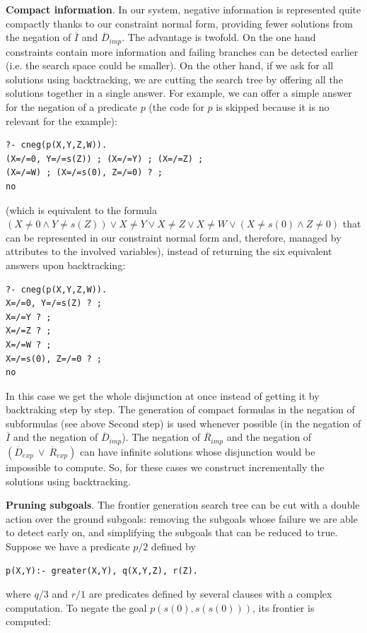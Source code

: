 \documentclass{tlp}
\begin{document}
\noindent
{\bf Compact information}. In our system, negative information is
represented quite compactly thanks to our constraint normal form,
providing fewer solutions from the negation of $\overline{I}$ and
$\overline{D}_{imp}$. The advantage is twofold. On the one hand
constraints contain more information and failing branches can be
detected earlier (i.e. the search space could be smaller). On the
other hand, if we ask for all solutions using backtracking, we are
cutting the search tree by offering all the solutions together in a
single answer. For example, we can offer a simple answer for the
negation of a predicate $p$ (the code for $p$ is skipped because it is
no relevant for the example): {
\begin{verbatim}
?- cneg(p(X,Y,Z,W)).
(X=/=0, Y=/=s(Z)) ; (X=/=Y) ; (X=/=Z) ; 
(X=/=W) ; (X=/=s(0), Z=/=0) ? ;
no
\end{verbatim}
}
\noindent
(which is equivalent to the formula $ (X \neq 0 \wedge Y\neq s(Z))
\vee X \neq Y \vee X \neq Z \vee X \neq W \vee (X \neq s(0) \wedge Z
\neq 0)$ that can be represented in our constraint normal form and,
therefore, managed by attributes to the involved variables), instead
of returning the six equivalent answers upon backtracking: {
\begin{verbatim}
?- cneg(p(X,Y,Z,W)).
X=/=0, Y=/=s(Z) ? ;
X=/=Y ? ;
X=/=Z ? ;
X=/=W ? ;
X=/=s(0), Z=/=0 ? ;
no
\end{verbatim}
} 
\noindent
In this case we get the whole disjunction at once instead of getting
it by backtraking step by step. The generation of compact formulas in
the negation of subformulas (see above Second step) is used whenever
possible (in the negation of $\overline{I}$ and the negation of
$\overline{D}_{imp}$). The negation of $\overline{R}_{imp}$ and the
negation of $(\overline{D}_{exp} ~ \vee ~ \overline{R}_{exp})$ can
have infinite solutions whose disjunction would be impossible to
compute. So, for these cases we construct incrementally the solutions
using backtracking.
\bigskip

\noindent
{\bf Pruning subgoals}. The frontier generation search tree can be
cut with a double action over the ground subgoals: removing the
subgoals whose failure we are able to detect early on, and simplifying the
subgoals that can be reduced to true. Suppose  we have a predicate $p/2$
defined by
{
\begin{verbatim}
p(X,Y):- greater(X,Y), q(X,Y,Z), r(Z).
\end{verbatim}
}\noindent
where $q/3$ and $r/1$ are predicates defined by several
clauses with a complex computation. To negate
the goal $p(s(0),s(s(0)))$, its frontier is computed:
\end{document}
